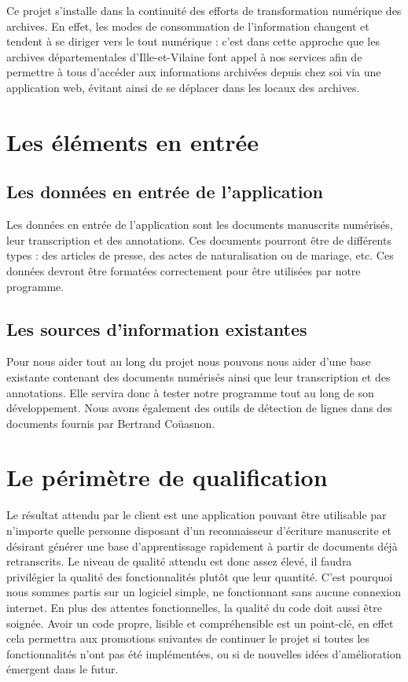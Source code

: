 Ce projet s’installe dans la continuité des efforts de transformation numérique des archives. En effet, les modes de consommation de l’information changent et tendent à se diriger vers le tout numérique : c’est dans cette approche que les archives départementales d’Ille-et-Vilaine font appel à nos services afin de permettre à tous d’accéder aux informations archivées depuis chez soi via une application web, évitant ainsi de se déplacer dans les locaux des archives.

\section{Les éléments en entrée}

\subsection{Les données en entrée de l'application}

Les données en entrée de l’application sont les documents manuscrits numérisés, leur transcription et des annotations. Ces documents pourront être de différents types : des articles de presse, des actes de naturalisation ou de mariage, etc. Ces données devront être formatées correctement pour être utilisées par notre programme.

\newpage

\subsection{Les sources d'information existantes}

Pour nous aider tout au long du projet nous pouvons nous aider d’une base existante contenant des documents numérisés ainsi que leur transcription et des annotations. Elle servira donc à tester notre programme tout au long de son développement. Nous avons également des outils de détection de lignes dans des documents fournis par Bertrand Coüasnon.

\section{Le périmètre de qualification}

Le résultat attendu par le client est une application pouvant être utilisable par n’importe quelle personne disposant d’un reconnaisseur d’écriture manuscrite et désirant générer une base d’apprentissage rapidement à partir de documents déjà retranscrits. Le niveau de qualité attendu est donc assez élevé, il faudra privilégier la qualité des fonctionnalités plutôt que leur quantité. C’est pourquoi nous sommes partis sur un logiciel simple, ne fonctionnant sans aucune connexion internet. En plus des attentes fonctionnelles, la qualité du code doit aussi être soignée. Avoir un code propre, lisible et compréhensible est un point-clé, en effet cela permettra aux promotions suivantes de continuer le projet si toutes les fonctionnalités n’ont pas été implémentées, ou si de nouvelles idées d’amélioration émergent dans le futur.


